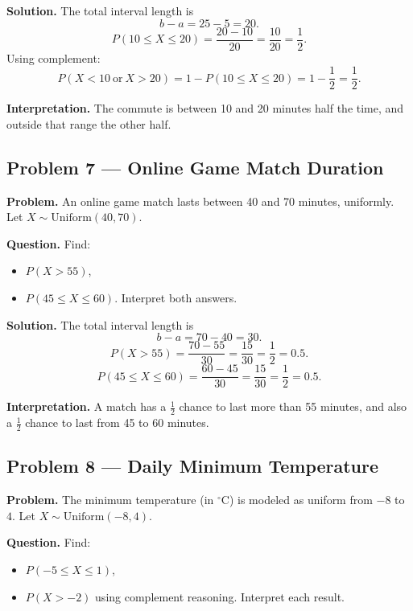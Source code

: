 \begin{ExamProblems}
\textbf{Solution.}
The total interval length is
\[
b-a=25-5=20.
\]
\[
P(10\le X\le 20)=\frac{20-10}{20}=\frac{10}{20}=\frac{1}{2}.
\]
Using complement:
\[
P(X<10\ \text{or}\ X>20)=1-P(10\le X\le 20)=1-\frac{1}{2}=\frac{1}{2}.
\]

\textbf{Interpretation.}
The commute is between 10 and 20 minutes half the time, and outside that range the other half.


\item
\subsection*{Problem 7 — Online Game Match Duration}

\textbf{Problem.}
An online game match lasts between 40 and 70 minutes, uniformly.
Let $X\sim \text{Uniform}(40,70)$.

\textbf{Question.}
Find:
\begin{itemize}
    \item[(a)] $P(X>55)$,
    \item[(b)] $P(45\le X\le 60)$.
Interpret both answers.
\end{itemize}

\textbf{Solution.}
The total interval length is
\[
b-a=70-40=30.
\]
\[
P(X>55)=\frac{70-55}{30}=\frac{15}{30}=\frac{1}{2}=0.5.
\]
\[
P(45\le X\le 60)=\frac{60-45}{30}=\frac{15}{30}=\frac{1}{2}=0.5.
\]

\textbf{Interpretation.}
A match has a $\frac{1}{2}$ chance to last more than 55 minutes, and also a $\frac{1}{2}$ chance to last from 45 to 60 minutes.


\item
\subsection*{Problem 8 — Daily Minimum Temperature}

\textbf{Problem.}
The minimum temperature (in $^\circ$C) is modeled as uniform from $-8$ to $4$.
Let $X\sim \text{Uniform}(-8,4)$.

\textbf{Question.}
Find:
\begin{itemize}
    \item[(a)] $P(-5\le X\le 1)$,
    \item[(b)] $P(X>-2)$ using complement reasoning.
Interpret each result.
\end{itemize}


\end{ExamProblems}

